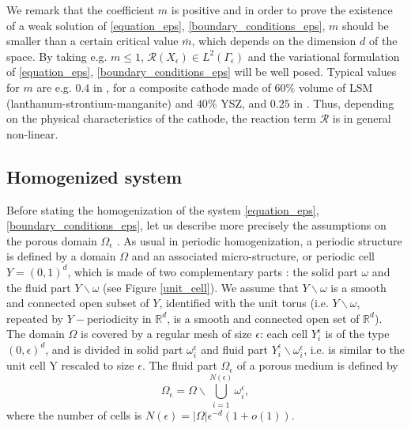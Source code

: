 \documentclass{article}
\newcommand{\Rbb} {\mathbb{R}}
\begin{document}
 We remark that the coefficient $m$ is positive and in order to prove the existence of a weak solution of \eqref{equation_eps}, \eqref{boundary_conditions_eps}, $m$ should be smaller than a certain critical value $\bar{m}$, which depends on the dimension $d$ of the space. By taking e.g. $m\leq 1$, $\mathcal{R}(X_\epsilon)\in L^2(\Gamma_\epsilon)$ and the variational formulation of \eqref{equation_eps}, \eqref{boundary_conditions_eps} will be well posed. Typical values for $m$ are e.g. $0.4$ in \cite{kenney2004mathematical}, for a composite cathode made of $60\%$ volume of LSM (lanthanum-strontium-manganite) and $40\%$ YSZ, and $0.25$ in \cite{costamagna2004electrochemical,bove2008modeling}. Thus, depending on the physical characteristics of the cathode, the reaction term $\mathcal{R}$ is in general non-linear.







\subsection{Homogenized system}

Before stating the homogenization of the system \eqref{equation_eps},\eqref{boundary_conditions_eps}, let us describe more precisely the assumptions on the porous domain $\Omega_\epsilon$ \cite{allaire2002shape}. As usual in periodic homogenization, a periodic structure is defined by a domain $\Omega$ and an associated micro-structure, or periodic cell $Y=(0,1)^d$, which is made of two complementary parts : the solid part $\omega$ and the fluid part $Y\backslash \omega$ (see Figure \ref{unit_cell}). 
We assume that $Y\backslash\omega$ is a smooth and connected open subset of $Y$, identified with the unit torus (i.e. $Y\backslash\omega$, repeated by $Y-$periodicity in $\Rbb^d$, is a smooth and connected open set of $\Rbb^d$). The domain $\Omega$ is covered by a regular mesh of size $\epsilon$: each cell $Y_i^{\epsilon}$ is of the type $(0,\epsilon)^d$, and is divided in solid part $\omega_i^{\epsilon}$ and fluid part $Y^{\epsilon}_i\backslash \omega_i^{\epsilon}$, i.e. is similar to the unit cell Y rescaled to size $\epsilon$. The fluid part 
$\Omega_{\epsilon}$ of a porous medium is defined by
\begin{equation*}
\Omega_{\epsilon}=\Omega\backslash \bigcup_{i=1}^{N(\epsilon)} \omega_i^{\epsilon},
\end{equation*}
where the number of cells is $N(\epsilon)=|\Omega|\epsilon^{-d}(1+o(1))$.\\
\end{document}
